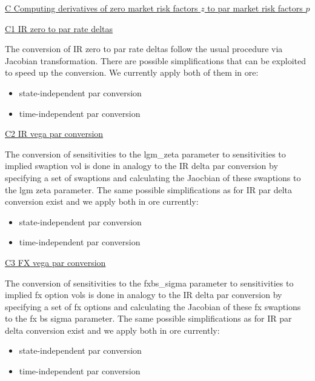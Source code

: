 \underline{C Computing derivatives of zero market risk factors $z$ to par market risk factors $p$}

\underline{C1 IR zero to par rate deltas}

The conversion of IR zero to par rate deltas follow the usual procedure via Jacobian transformation. There are possible simplifications that can be exploited to speed up the conversion. We currently apply both of them in ore:

\begin{itemize}
\item state-independent par conversion
\item time-independent par conversion
\end{itemize}

\underline{C2 IR vega par conversion}

The conversion of sensitivities to the lgm\_zeta parameter to sensitivities to implied swaption vol is done in analogy
to the IR delta par conversion by specifying a set of swaptions and calculating the Jaocbian of these swaptions to the
lgm zeta parameter. The same possible simplifications as for IR par delta conversion exist and we apply both in ore
currently:

\begin{itemize}
\item state-independent par conversion
\item time-independent par conversion
\end{itemize}

\underline{C3 FX vega par conversion}

The conversion of sensitivities to the fxbs\_sigma parameter to sensitivities to implied fx option vols is done in
analogy to the IR delta par conversion by specifying a set of fx options and calculating the Jacobian of these fx
swaptions to the fx bs sigma parameter. The same possible simplifications as for IR par delta conversion exist and we
apply both in ore currently:

\begin{itemize}
\item state-independent par conversion
\item time-independent par conversion
\end{itemize}
